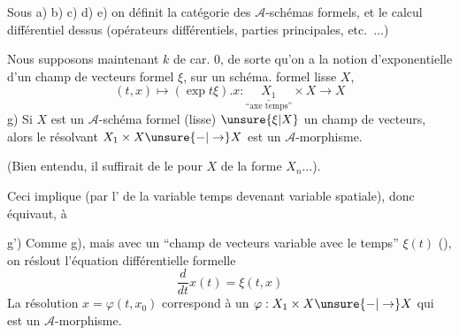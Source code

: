 
Sous a) b) c) d) e) on définit la catégorie des $\mathcal A$-schémas formels, et le calcul différentiel dessus (opérateurs différentiels, parties principales, etc.\ $\ldots$)

Nous supposons maintenant $k$ de car. $0$, de sorte qu'on a la notion d'exponentielle d'un champ de vecteurs formel $\xi$, sur  un schéma. formel lisse $X$,
\[
(t,x)\longmapsto(\exp t\xi).x:\underset{\text{``axe temps''}}{\underline{X_1}}\times X\longrightarrow X
\]
g) Si $X$ est un $\mathcal A$-schéma formel (lisse) $\unsure{\xi|X}$ un champ de vecteurs, alors le résolvant $X_1\times X\unsure{-|\to}X$ est un $\mathcal A$-morphisme.

(Bien entendu, il suffirait de le  pour $X$ de la forme $X_n\ldots$).

Ceci implique (par l' de la variable temps devenant variable spatiale), donc équivaut, à

g') Comme g), mais avec un ``champ de vecteurs variable avec le temps'' $\xi(t)$
(), on réslout l'équation différentielle formelle
\[
\frac{d}{dt}x(t)=\xi(t,x)
\]
La résolution $x=\varphi(t,x_0)$ correspond à un $\varphi:X_1\times X\unsure{-|\to}X$ qui est un $\mathcal A$-morphisme.

